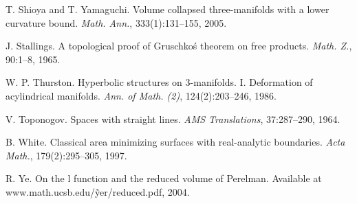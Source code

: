 \begin{thebibliography}{99}
    T. Shioya and T. Yamaguchi. Volume collapsed three-manifolds with a lower curvature bound. \textit{Math. Ann.}, 333(1):131–155, 2005.

    J. Stallings. A topological proof of Gruschko\'s theorem on free products. \textit{Math. Z.}, 90:1–8, 1965.

    W. P. Thurston. Hyperbolic structures on 3-manifolds. I. Deformation of acylindrical manifolds. \textit{Ann. of Math. (2)}, 124(2):203–246, 1986.

    V. Toponogov. Spaces with straight lines. \textit{AMS Translations}, 37:287–290, 1964.

    B. White. Classical area minimizing surfaces with real-analytic boundaries. \textit{Acta Math.}, 179(2):295–305, 1997.

    R. Ye. On the l function and the reduced volume of Perelman. Available at www.math.ucsb.edu/\~yer/reduced.pdf, 2004.

\end{thebibliography}
